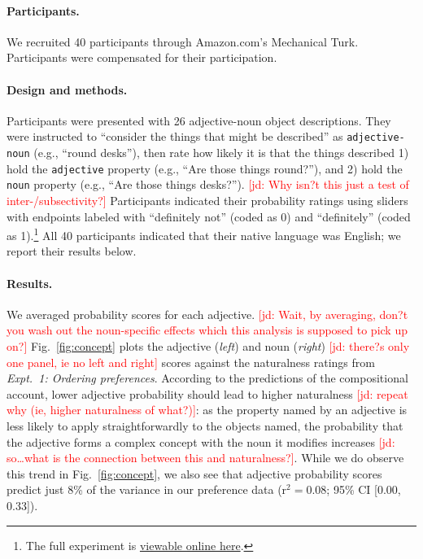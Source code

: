 \documentclass[12pt]{article}
\newcommand{\jd}[1]{\textcolor{red}{[jd: #1]}}
\begin{document}
\paragraph{Participants.} We recruited 40 participants through Amazon.com's Mechanical Turk.  Participants were compensated for their participation.

\paragraph{Design and methods.} Participants were presented with 26 adjective-noun object descriptions. They were instructed to ``consider the things that might be described'' as \texttt{adjective-noun} (e.g., ``round desks''), then rate how likely it is that the things described 1) hold the \texttt{adjective} property (e.g., ``Are those things round?''), and 2) hold the \texttt{noun} property (e.g., ``Are those things desks?''). \jd{Why isn?t this just a test of inter-/subsectivity?} Participants indicated their probability ratings using sliders with endpoints labeled with ``definitely not'' (coded as 0) and ``definitely'' (coded as 1).\footnote{The full experiment is \href{http://web.stanford.edu/~scontras/adjective_ordering/experiments/9-concept-formability/concept-formability.html}{viewable online here}.} All 40 participants indicated that their native language was English; we report their results below.

\paragraph{Results.} We averaged probability scores for each adjective. \jd{Wait, by averaging, don?t you wash out the noun-specific effects which this analysis is supposed to pick up on?} Fig.~\ref{fig:concept} plots the adjective (\emph{left}) and noun (\emph{right}) \jd{there?s only one panel, ie no left and right} scores against the naturalness ratings from \emph{Expt.~1: Ordering preferences}. According to the predictions of the compositional account, lower adjective probability should lead to higher naturalness \jd{repeat why (ie, higher naturalness of what?)}: as the property named by an adjective is less likely to apply straightforwardly to the objects named, the probability that the adjective forms a complex concept with the noun it modifies increases \jd{so\dots what is the connection between this and naturalness?}. While we do observe this trend in Fig.~\ref{fig:concept}, we also see that adjective probability scores predict just 8\% of the variance in our preference data (r$^{2}=0.08$; 95\% CI [0.00,  0.33]). %
\end{document}
